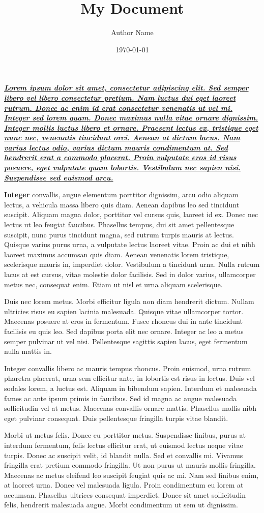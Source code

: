 \documentclass{article}
\title{My Document}\author{Author Name}\date{\today}
\begin{document}
\underline{\textbf{\textit{Lorem ipsum dolor sit amet, consectetur adipiscing elit. Sed semper libero vel libero consectetur pretium. Nam luctus dui eget laoreet rutrum. Donec ac enim id erat consectetur venenatis ut vel mi. Integer sed lorem quam. Donec maximus nulla vitae ornare dignissim. Integer mollis luctus libero et ornare. Praesent lectus ex, tristique eget nunc nec, venenatis tincidunt orci. Aenean at dictum lacus. Nam varius lectus odio, varius dictum mauris condimentum at. Sed hendrerit erat a commodo placerat. Proin vulputate eros id risus posuere, eget vulputate quam lobortis. Vestibulum nec sapien nisi. Suspendisse sed euismod arcu.}}}

\textbf{Integer} convallis, augue elementum porttitor dignissim, arcu odio aliquam lectus, a vehicula massa libero quis diam. Aenean dapibus leo sed tincidunt suscipit. Aliquam magna dolor, porttitor vel cursus quis, laoreet id ex. Donec nec lectus ut leo feugiat faucibus. Phasellus tempus, dui sit amet pellentesque suscipit, nunc purus tincidunt magna, sed rutrum turpis mauris at lectus. Quisque varius purus urna, a vulputate lectus laoreet vitae. Proin ac dui et nibh laoreet maximus accumsan quis diam. Aenean venenatis lorem tristique, scelerisque mauris in, imperdiet dolor. Vestibulum a tincidunt urna. Nulla rutrum lacus at est cursus, vitae molestie dolor facilisis. Sed in dolor varius, ullamcorper metus nec, consequat enim. Etiam ut nisl et urna aliquam scelerisque.

Duis nec lorem metus. Morbi efficitur ligula non diam hendrerit dictum. Nullam ultricies risus eu sapien lacinia malesuada. Quisque vitae ullamcorper tortor. Maecenas posuere at eros in fermentum. Fusce rhoncus dui in ante tincidunt facilisis eu quis leo. Sed dapibus porta elit nec ornare. Integer ac leo a metus semper pulvinar ut vel nisi. Pellentesque sagittis sapien lacus, eget fermentum nulla mattis in.

Integer convallis libero ac mauris tempus rhoncus. Proin euismod, urna rutrum pharetra placerat, urna sem efficitur ante, in lobortis est risus in lectus. Duis vel sodales lorem, a luctus est. Aliquam in bibendum sapien. Interdum et malesuada fames ac ante ipsum primis in faucibus. Sed id magna ac augue malesuada sollicitudin vel at metus. Maecenas convallis ornare mattis. Phasellus mollis nibh eget pulvinar consequat. Duis pellentesque fringilla turpis vitae blandit.

Morbi ut metus felis. Donec eu porttitor metus. Suspendisse finibus, purus at interdum fermentum, felis lectus efficitur erat, ut euismod lectus neque vitae turpis. Donec ac suscipit velit, id blandit nulla. Sed et convallis mi. Vivamus fringilla erat pretium commodo fringilla. Ut non purus ut mauris mollis fringilla. Maecenas ac metus eleifend leo suscipit feugiat quis ac mi. Nam sed finibus enim, at laoreet urna. Donec vel malesuada ligula. Proin condimentum eu lorem at accumsan. Phasellus ultrices consequat imperdiet. Donec sit amet sollicitudin felis, hendrerit malesuada augue. Morbi condimentum ut sem ut dignissim.
\end{document}
